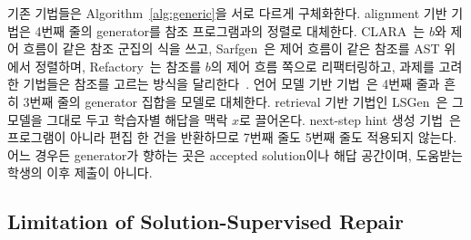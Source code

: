 \documentclass[10pt,conference]{IEEEtran}
\begin{document}
기존 기법들은 Algorithm~\ref{alg:generic}을 서로 다르게 구체화한다. alignment 기반 기법은 4번째 줄의 generator를 참조 프로그램과의 정렬로 대체한다. CLARA~\cite{gulwani2018automated}는 \(b\)와 제어 흐름이 같은 참조 군집의 식을 쓰고, Sarfgen~\cite{wang2018search}은 제어 흐름이 같은 참조를 AST 위에서 정렬하며, Refactory~\cite{hu2019re}는 참조를 \(b\)의 제어 흐름 쪽으로 리팩터링하고, 과제를 고려한 기법들은 참조를 고르는 방식을 달리한다~\cite{heo2023referent,choi2021automated,choi2025automated}. 언어 모델 기반 기법~\cite{joshi2023repair,zhang2024pydex,phung2023generating,liu2024fastfixer,yang2024cref,zhao2026peer,orvalho2025counterexample}은 4번째 줄과 흔히 3번째 줄의 generator 집합을 모델로 대체한다. retrieval 기반 기법인 LSGen~\cite{dai2026learner}은 그 모델을 그대로 두고 학습자별 해답을 맥락 \(x\)로 끌어온다. next-step hint 생성 기법~\cite{piech2015embeddings,rivers2017data,price2017isnap,roest2024next}은 프로그램이 아니라 편집 한 건을 반환하므로 7번째 줄도 5번째 줄도 적용되지 않는다. 어느 경우든 generator가 향하는 곳은 accepted solution이나 해답 공간이며, 도움받는 학생의 이후 제출이 아니다.

\subsection{Limitation of Solution-Supervised Repair}
\label{sec:limitation}
\end{document}
